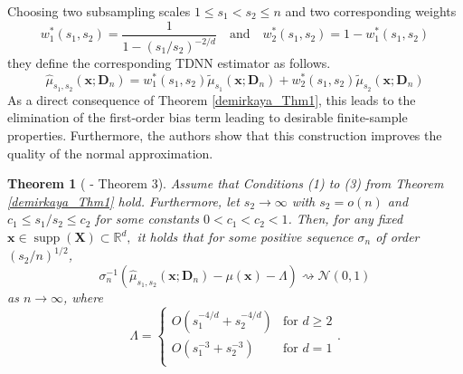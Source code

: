 \documentclass[letterpaper,10pt]{article}
\numberwithin{equation}{section}
\newtheorem{thm}{Theorem}
\numberwithin{thm}{section}
\renewcommand{\hat}{\widehat}
\newcommand{\1}{\mathbb{1}}
\begin{document}
Choosing two subsampling scales $1 \leq s_1 < s_2 \leq n$ and two corresponding weights
\begin{equation}
	w_1^{*}(s_1, s_2) = \frac{1}{1-(s_1/s_2)^{-2/d}}
	\quad\text{and}\quad
	w_2^{*}(s_1, s_2) = 1 - w_1^{*}(s_1, s_2)
\end{equation}
they define the corresponding TDNN estimator as follows.
\begin{equation}
	\hat{\mu}_{s_1, s_2}\left(\mathbf{x}; \mathbf{D}_n\right)
	= w_1^{*}(s_1, s_2)\tilde{\mu}_{s_1}\left(\mathbf{x}; \mathbf{D}_n\right) + w_2^{*}(s_1, s_2)\tilde{\mu}_{s_2}\left(\mathbf{x}; \mathbf{D}_n\right)
\end{equation}
As a direct consequence of Theorem \ref{demirkaya_Thm1}, this leads to the elimination of the first-order bias term leading to desirable finite-sample properties.
Furthermore, the authors show that this construction improves the quality of the normal approximation.

\vspace{0.5cm}
\begin{thm}[\citet{demirkaya_optimal_2024} - Theorem 3]\label{demirkaya_Thm3}
	Assume that Conditions (1) to (3) from Theorem \ref{demirkaya_Thm1} hold.
	Furthermore, let $s_2 \rightarrow \infty$ with $s_2 = o(n)$ and $c_1 \leq s_1/s_2 \leq c_2$ for some constants $0 < c_1 < c_2 < 1$.
	Then, for any fixed $\mathbf{x} \in \operatorname{supp}(\mathbf{X}) \subset \mathbb{R}^d,$ it holds that for some positive sequence $\sigma_n$ of order $(s_2/n)^{1/2}$,
	\begin{equation}
		\sigma_n^{-1} \left(\hat{\mu}_{s_1, s_2}\left(\mathbf{x}; \mathbf{D}_n\right) - \mu(\mathbf{x}) - \Lambda\right) \rightsquigarrow \mathcal{N}(0,1)
	\end{equation}
	as $n \rightarrow \infty$, where
	\begin{equation*}
		\Lambda = \begin{cases}
			O\left(s_1^{-4/d} + s_2^{-4/d}\right) & \text{for } d \geq 2 \\
			O\left(s_1^{-3} + s_2^{-3}\right)     & \text{for } d = 1    \\
		\end{cases}.
	\end{equation*}
\end{thm}
\end{document}
